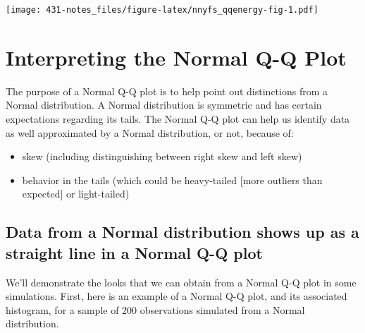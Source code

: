 \documentclass[
]{book}
\providecommand{\tightlist}{%
  \setlength{\itemsep}{0pt}\setlength{\parskip}{0pt}}
\begin{document}
\texttt{[image: 431-notes\_files/figure-latex/nnyfs\_qqenergy-fig-1.pdf]}

\hypertarget{interpreting-the-normal-q-q-plot}{%
\section{Interpreting the Normal Q-Q Plot}\label{interpreting-the-normal-q-q-plot}}

The purpose of a Normal Q-Q plot is to help point out distinctions from a Normal distribution. A Normal distribution is symmetric and has certain expectations regarding its tails. The Normal Q-Q plot can help us identify data as well approximated by a Normal distribution, or not, because of:

\begin{itemize}
\tightlist
\item
  skew (including distinguishing between right skew and left skew)
\item
  behavior in the tails (which could be heavy-tailed {[}more outliers than expected{]} or light-tailed)
\end{itemize}

\hypertarget{data-from-a-normal-distribution-shows-up-as-a-straight-line-in-a-normal-q-q-plot}{%
\subsection{Data from a Normal distribution shows up as a straight line in a Normal Q-Q plot}\label{data-from-a-normal-distribution-shows-up-as-a-straight-line-in-a-normal-q-q-plot}}

We'll demonstrate the looks that we can obtain from a Normal Q-Q plot in some simulations. First, here is an example of a Normal Q-Q plot, and its associated histogram, for a sample of 200 observations simulated from a Normal distribution.
\end{document}
